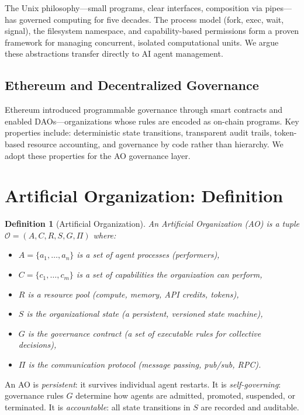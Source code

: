 \documentclass[11pt,a4paper]{article}
\newtheorem{definition}{Definition}
\begin{document}
The Unix philosophy---small programs, clear interfaces, composition via
pipes---has governed computing for five decades. The process model (fork, exec,
wait, signal), the filesystem namespace, and capability-based permissions form
a proven framework for managing concurrent, isolated computational units. We
argue these abstractions transfer directly to AI agent management.

\subsection{Ethereum and Decentralized Governance}

Ethereum introduced programmable governance through smart contracts and enabled
DAOs---organizations whose rules are encoded as on-chain programs. Key
properties include: deterministic state transitions, transparent audit trails,
token-based resource accounting, and governance by code rather than
hierarchy. We adopt these properties for the AO governance layer.

\section{Artificial Organization: Definition}

\begin{definition}[Artificial Organization]
An \emph{Artificial Organization} (AO) is a tuple
$\mathcal{O} = (A, C, R, S, G, \Pi)$ where:
\begin{itemize}[nosep]
  \item $A = \{a_1, \ldots, a_n\}$ is a set of \emph{agent processes} (performers),
  \item $C = \{c_1, \ldots, c_m\}$ is a set of \emph{capabilities} the organization can perform,
  \item $R$ is a \emph{resource pool} (compute, memory, API credits, tokens),
  \item $S$ is the \emph{organizational state} (a persistent, versioned state machine),
  \item $G$ is the \emph{governance contract} (a set of executable rules for collective decisions),
  \item $\Pi$ is the \emph{communication protocol} (message passing, pub/sub, RPC).
\end{itemize}
\end{definition}

An AO is \emph{persistent}: it survives individual agent restarts. It is
\emph{self-governing}: governance rules $G$ determine how agents are
admitted, promoted, suspended, or terminated. It is \emph{accountable}: all
state transitions in $S$ are recorded and auditable.
\end{document}
